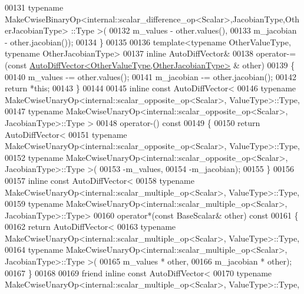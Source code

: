 \begin{DoxyCode}
00131         \textcolor{keyword}{typename} MakeCwiseBinaryOp<internal::scalar\_difference\_op<Scalar>,JacobianType,OtherJacobianType>
      ::Type >(
00132           m\_values - other.values(),
00133           m\_jacobian - other.jacobian());
00134     \}
00135 
00136     \textcolor{keyword}{template}<\textcolor{keyword}{typename} OtherValueType, \textcolor{keyword}{typename} OtherJacobianType>
00137     \textcolor{keyword}{inline} AutoDiffVector&
00138     operator-=(\textcolor{keyword}{const} \hyperlink{class_eigen_1_1_auto_diff_vector}{AutoDiffVector<OtherValueType,OtherJacobianType>}
      & other)
00139     \{
00140       m\_values -= other.values();
00141       m\_jacobian -= other.jacobian();
00142       \textcolor{keywordflow}{return} *\textcolor{keyword}{this};
00143     \}
00144 
00145     \textcolor{keyword}{inline} \textcolor{keyword}{const} AutoDiffVector<
00146       \textcolor{keyword}{typename} MakeCwiseUnaryOp<internal::scalar\_opposite\_op<Scalar>, ValueType>::Type,
00147       \textcolor{keyword}{typename} MakeCwiseUnaryOp<internal::scalar\_opposite\_op<Scalar>, JacobianType>::Type >
00148     operator-()\textcolor{keyword}{ const}
00149 \textcolor{keyword}{    }\{
00150       \textcolor{keywordflow}{return} AutoDiffVector<
00151         \textcolor{keyword}{typename} MakeCwiseUnaryOp<internal::scalar\_opposite\_op<Scalar>, ValueType>::Type,
00152         \textcolor{keyword}{typename} MakeCwiseUnaryOp<internal::scalar\_opposite\_op<Scalar>, JacobianType>::Type >(
00153           -m\_values,
00154           -m\_jacobian);
00155     \}
00156 
00157     \textcolor{keyword}{inline} \textcolor{keyword}{const} AutoDiffVector<
00158       \textcolor{keyword}{typename} MakeCwiseUnaryOp<internal::scalar\_multiple\_op<Scalar>, ValueType>::Type,
00159       \textcolor{keyword}{typename} MakeCwiseUnaryOp<internal::scalar\_multiple\_op<Scalar>, JacobianType>::Type>
00160     operator*(\textcolor{keyword}{const} BaseScalar& other)\textcolor{keyword}{ const}
00161 \textcolor{keyword}{    }\{
00162       \textcolor{keywordflow}{return} AutoDiffVector<
00163         \textcolor{keyword}{typename} MakeCwiseUnaryOp<internal::scalar\_multiple\_op<Scalar>, ValueType>::Type,
00164         \textcolor{keyword}{typename} MakeCwiseUnaryOp<internal::scalar\_multiple\_op<Scalar>, JacobianType>::Type >(
00165           m\_values * other,
00166           m\_jacobian * other);
00167     \}
00168 
00169     \textcolor{keyword}{friend} \textcolor{keyword}{inline} \textcolor{keyword}{const} AutoDiffVector<
00170       \textcolor{keyword}{typename} MakeCwiseUnaryOp<internal::scalar\_multiple\_op<Scalar>, ValueType>::Type,

\end{DoxyCode}
